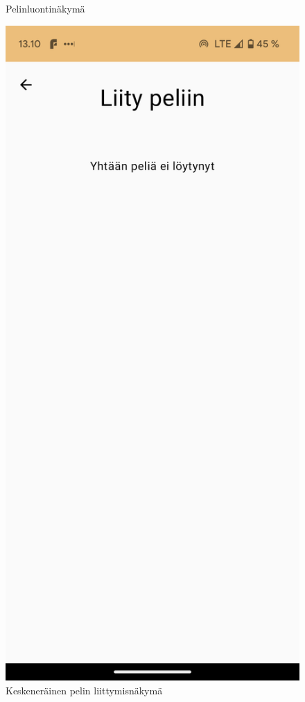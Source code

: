 \begin{figure}[h!]
\begin{minipage}[t]{.3\textwidth}
            \caption{Pelinluontinäkymä}
            \label{fig:screenshot-create-game}
      \end{minipage}
      \begin{minipage}[t]{.3\textwidth}
            \includegraphics[width=\textwidth]{figures/screenshot-join-game.png}
            \caption{Keskeneräinen pelin liittymisnäkymä}
            \label{fig:screenshot-join-game}
      \end{minipage}
\end{figure}

